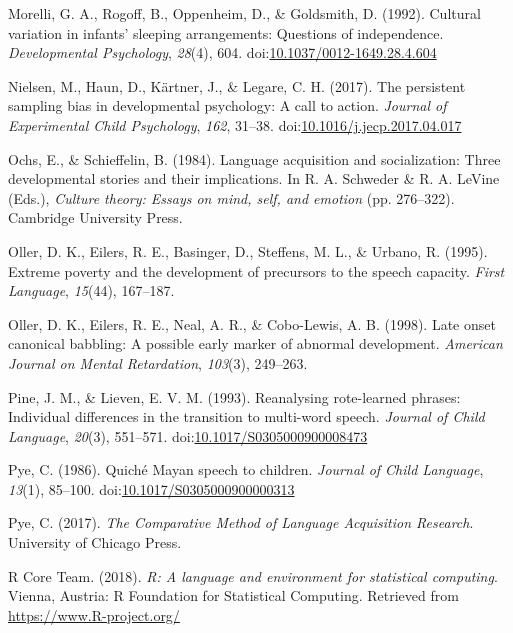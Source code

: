 \documentclass[floatsintext,man]{apa6}
\theoremstyle{definition}
\theoremstyle{definition}
\theoremstyle{definition}
\theoremstyle{remark}
\begin{document}
\hypertarget{ref-morelli1992cultural}{}
Morelli, G. A., Rogoff, B., Oppenheim, D., \& Goldsmith, D. (1992).
Cultural variation in infants' sleeping arrangements: Questions of
independence. \emph{Developmental Psychology}, \emph{28}(4), 604.
doi:\href{https://doi.org/10.1037/0012-1649.28.4.604}{10.1037/0012-1649.28.4.604}

\hypertarget{ref-nielsen2017persistent}{}
Nielsen, M., Haun, D., Kärtner, J., \& Legare, C. H. (2017). The
persistent sampling bias in developmental psychology: A call to action.
\emph{Journal of Experimental Child Psychology}, \emph{162}, 31--38.
doi:\href{https://doi.org/10.1016/j.jecp.2017.04.017}{10.1016/j.jecp.2017.04.017}

\hypertarget{ref-ochs1984language}{}
Ochs, E., \& Schieffelin, B. (1984). Language acquisition and
socialization: Three developmental stories and their implications. In R.
A. Schweder \& R. A. LeVine (Eds.), \emph{Culture theory: Essays on
mind, self, and emotion} (pp. 276--322). Cambridge University Press.

\hypertarget{ref-oller1995extreme}{}
Oller, D. K., Eilers, R. E., Basinger, D., Steffens, M. L., \& Urbano,
R. (1995). Extreme poverty and the development of precursors to the
speech capacity. \emph{First Language}, \emph{15}(44), 167--187.

\hypertarget{ref-oller1998late}{}
Oller, D. K., Eilers, R. E., Neal, A. R., \& Cobo-Lewis, A. B. (1998).
Late onset canonical babbling: A possible early marker of abnormal
development. \emph{American Journal on Mental Retardation},
\emph{103}(3), 249--263.

\hypertarget{ref-pine1993reanalysing}{}
Pine, J. M., \& Lieven, E. V. M. (1993). Reanalysing rote-learned
phrases: Individual differences in the transition to multi-word speech.
\emph{Journal of Child Language}, \emph{20}(3), 551--571.
doi:\href{https://doi.org/10.1017/S0305000900008473}{10.1017/S0305000900008473}

\hypertarget{ref-pye1986quiche}{}
Pye, C. (1986). Quiché Mayan speech to children. \emph{Journal of Child
Language}, \emph{13}(1), 85--100.
doi:\href{https://doi.org/10.1017/S0305000900000313}{10.1017/S0305000900000313}

\hypertarget{ref-pye2017comparative}{}
Pye, C. (2017). \emph{The Comparative Method of Language Acquisition
Research}. University of Chicago Press.

\hypertarget{ref-R-base}{}
R Core Team. (2018). \emph{R: A language and environment for statistical
computing}. Vienna, Austria: R Foundation for Statistical Computing.
Retrieved from \url{https://www.R-project.org/}
\end{document}
